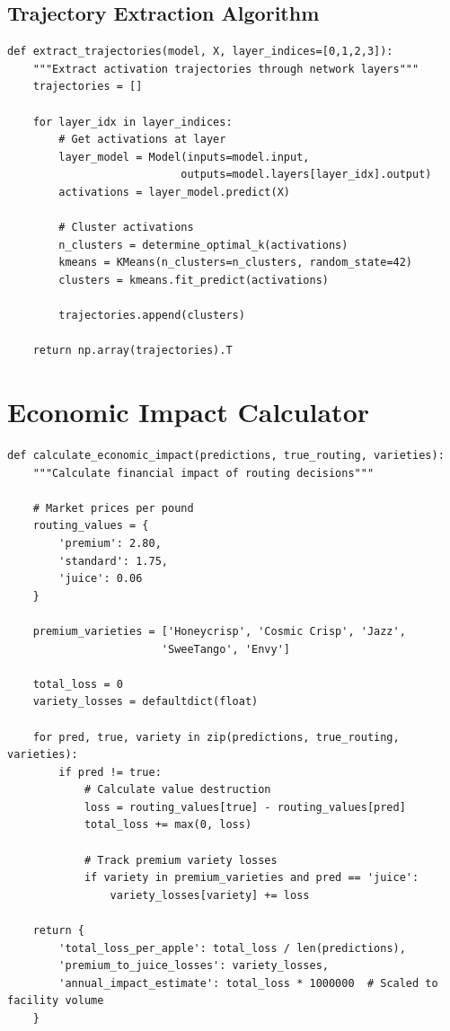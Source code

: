 \documentclass[11pt,a4paper]{article}
\begin{document}
\subsection{Trajectory Extraction Algorithm}

\begin{lstlisting}
def extract_trajectories(model, X, layer_indices=[0,1,2,3]):
    """Extract activation trajectories through network layers"""
    trajectories = []
    
    for layer_idx in layer_indices:
        # Get activations at layer
        layer_model = Model(inputs=model.input,
                           outputs=model.layers[layer_idx].output)
        activations = layer_model.predict(X)
        
        # Cluster activations
        n_clusters = determine_optimal_k(activations)
        kmeans = KMeans(n_clusters=n_clusters, random_state=42)
        clusters = kmeans.fit_predict(activations)
        
        trajectories.append(clusters)
    
    return np.array(trajectories).T
\end{lstlisting}

\section{Economic Impact Calculator}

\begin{lstlisting}
def calculate_economic_impact(predictions, true_routing, varieties):
    """Calculate financial impact of routing decisions"""
    
    # Market prices per pound
    routing_values = {
        'premium': 2.80,
        'standard': 1.75,
        'juice': 0.06
    }
    
    premium_varieties = ['Honeycrisp', 'Cosmic Crisp', 'Jazz', 
                        'SweeTango', 'Envy']
    
    total_loss = 0
    variety_losses = defaultdict(float)
    
    for pred, true, variety in zip(predictions, true_routing, varieties):
        if pred != true:
            # Calculate value destruction
            loss = routing_values[true] - routing_values[pred]
            total_loss += max(0, loss)
            
            # Track premium variety losses
            if variety in premium_varieties and pred == 'juice':
                variety_losses[variety] += loss
    
    return {
        'total_loss_per_apple': total_loss / len(predictions),
        'premium_to_juice_losses': variety_losses,
        'annual_impact_estimate': total_loss * 1000000  # Scaled to facility volume
    }
\end{lstlisting}
\end{document}
